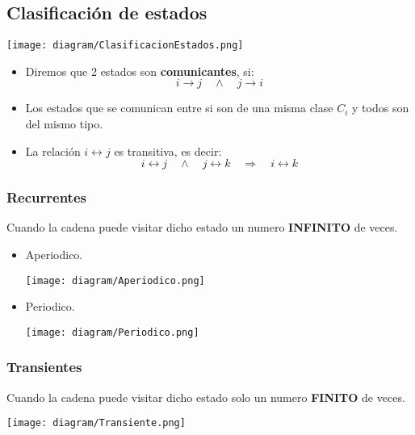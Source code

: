 \documentclass{templateNote}
\begin{document}
\newpage
\subsection{Clasificaci\'on de estados}
\begin{center}
    \texttt{[image: diagram/ClasificacionEstados.png]}
\end{center}
\begin{itemize}
    \item Diremos que 2 estados son \textbf{comunicantes}, si:
    \begin{equation*}
        i \rightarrow j \quad \wedge \quad j \rightarrow i
    \end{equation*}

    \item Los estados que se comunican entre si son de una misma clase $C_i$ y todos son del mismo tipo.
    
    \item La relaci\'on $i \leftrightarrow j$ es transitiva, es decir:
    \begin{equation*}
        i \leftrightarrow j \quad \wedge \quad j \leftrightarrow k \quad \Rightarrow \quad i \leftrightarrow k
    \end{equation*}
\end{itemize}
\subsubsection{Recurrentes}
Cuando la cadena puede visitar dicho estado un numero \textbf{INFINITO} de veces.
\begin{itemize}
    \item Aperiodico.
    \begin{center}
        \texttt{[image: diagram/Aperiodico.png]}
    \end{center}

    \item Periodico.
    \begin{center}
        \texttt{[image: diagram/Periodico.png]}
    \end{center}
\end{itemize}

\subsubsection{Transientes}
Cuando la cadena puede visitar dicho estado solo un numero \textbf{FINITO} de veces.
\begin{center}
    \texttt{[image: diagram/Transiente.png]}
\end{center}
\end{document}

